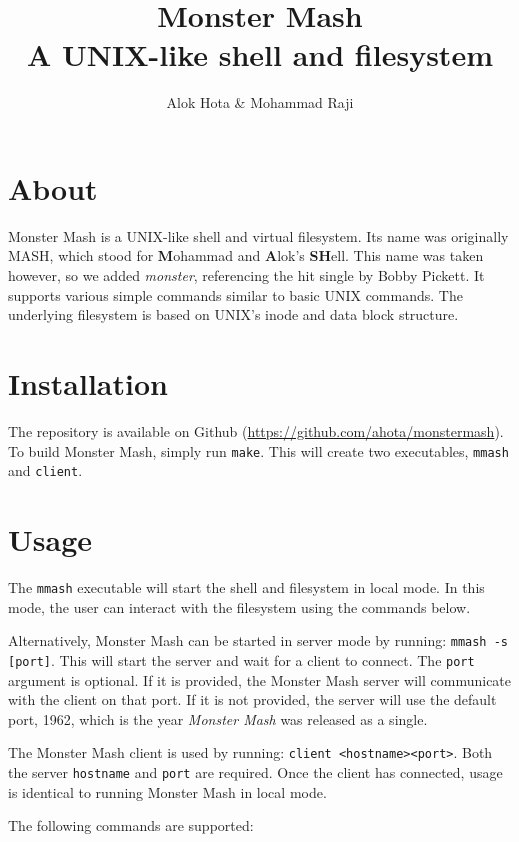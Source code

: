 \documentclass[]{article}
\title{\color{darkgray} Monster Mash \\ \large \color{lightgray} A UNIX-like shell and filesystem }
\author{Alok Hota \& Mohammad Raji}
\begin{document}
\maketitle

\pagebreak
{}

\color{body}
\section{About}
Monster Mash is a UNIX-like shell and virtual filesystem. Its name was originally MASH, which stood for \textbf{M}ohammad and \textbf{A}lok's \textbf{SH}ell. This name was taken however, so we added \textit{monster}, referencing the hit single by Bobby Pickett. It supports various simple commands similar to basic UNIX commands. The underlying filesystem is based on UNIX's inode and data block structure. 

\section{Installation}
The repository is available on Github (\url{https://github.com/ahota/monstermash}). To build Monster Mash, simply run \texttt{make}. This will create two executables, \texttt{mmash} and \texttt{client}. 

\section{Usage}
The \texttt{mmash} executable will start the shell and filesystem in local mode. In this mode, the user can interact with the filesystem using the commands below. 

Alternatively, Monster Mash can be started in server mode by running: \texttt{mmash -s [port]}. This will start the server and wait for a client to connect. The \texttt{port} argument is optional. If it is provided, the Monster Mash server will communicate with the client on that port. If it is not provided, the server will use the default port, 1962, which is the year \textit{Monster Mash} was released as a single.

The Monster Mash client is used by running: \texttt{client \textless hostname\textgreater \space \textless port\textgreater}. Both the server \texttt{hostname} and \texttt{port} are required. Once the client has connected, usage is identical to running Monster Mash in local mode.

The following commands are supported:
\end{document}
